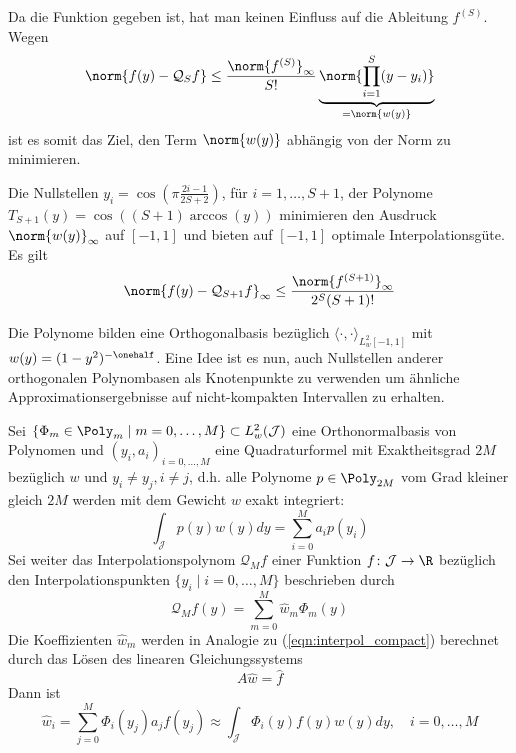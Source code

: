 Da die Funktion gegeben ist, hat man keinen Einfluss auf die Ableitung $f^{(S)}$. Wegen
\[\norm{f(y)-\mathcal{Q}_{S}f}\le \frac{\norm{f^{(S)}}_\infty}{S!}\underbrace{\norm{\prod_{i=1}^{S}(y-y_i)}}_{=\norm{w(y)}}\]
ist es somit das Ziel, den Term $\norm{w(y)}$ abhängig von der Norm zu minimieren.
\begin{mathbem}
\label{bem:cheby}
Die Nullstellen $y_i=\cos\left(\pi\frac{2i-1}{2S+2}\right)$, für $i=1,\dots,S+1$, der \chebyspace Polynome $T_{S+1}(y)=\cos((S+1)\arccos(y))$ minimieren den Ausdruck $\norm{w(y)}_\infty$ auf $[-1,1]$ und bieten auf $[-1,1]$ optimale Interpolationsgüte. Es gilt 
\[\norm{f(y)-\mathcal{Q}_{S+1}f}_\infty\le \frac{\norm{f^{(S+1)}}_\infty}{2^S(S+1)!}\]
\end{mathbem}
Die \chebyspace Polynome bilden eine Orthogonalbasis bezüglich $\langle \cdot,\cdot\rangle_{L_w^2[-1,1]}$ mit $w(y)=(1-y^2)^{-\onehalf}$. Eine Idee ist es nun, auch Nullstellen anderer orthogonalen Polynombasen als Knotenpunkte zu verwenden um ähnliche Approximationsergebnisse auf nicht-kompakten Intervallen zu erhalten.
\begin{maththeorem}
\label{th:interpol_and_proj}
Sei $\lbrace \Phi_m\in\Poly_m\mid m=0,\dots,M\rbrace\subset L_w^2(\mathcal{J})$ eine Orthonormalbasis von Polynomen und $(y_i,a_i)_{i=0,\dots,M}$ eine Quadraturformel mit Exaktheitsgrad $2M$ bezüglich $w$ und $y_i\neq y_j,i\neq j$, d.h. alle Polynome $p\in\Poly_{2M}$ vom Grad kleiner gleich $2M$ werden mit dem Gewicht $w$ exakt integriert:
\[\int_\mathcal{J} p(y)w(y)dy=\sum_{i=0}^M a_ip(y_i)\]
Sei weiter das Interpolationspolynom  $\mathcal{Q}_Mf$ einer Funktion $f\colon \mathcal{J}\to\R$ bezüglich den Interpolationspunkten $\lbrace y_i\mid i=0,\dots,M\rbrace$ beschrieben durch
\[\mathcal{Q}_Mf(y)=\sum_{m=0}^M\hat{w}_m\Phi_m(y)\]
Die Koeffizienten $\hat{w}_m$ werden in Analogie zu (\ref{eqn:interpol_compact}) berechnet durch das Lösen des linearen Gleichungssystems
\[A\hat{w}=\hat{f}\]
Dann ist \[\hat{w}_i=\sum_{j=0}^M\Phi_i(y_j)a_jf(y_j)\approx \int_\mathcal{J} \Phi_i(y)f(y)w(y)dy,\quad i=0,\dots,M\]
\end{maththeorem}
